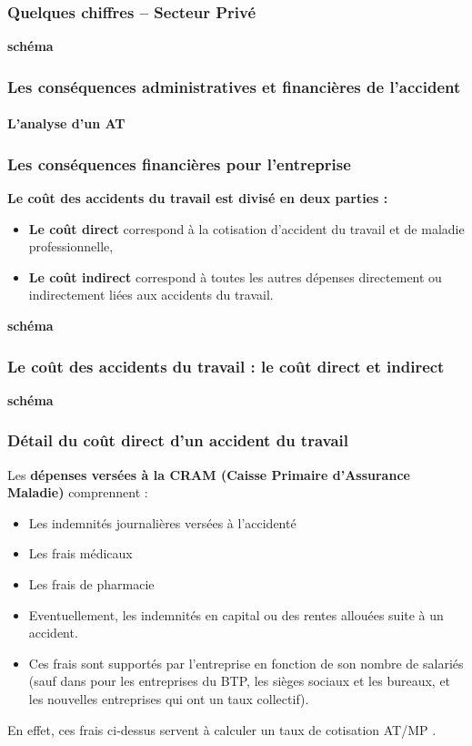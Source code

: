 \documentclass{beamer}
\begin{document}
\begin{frame}
\frametitle{Quelques chiffres – Secteur Privé}

\textbf{schéma}
\end{frame}

\begin{frame}
\frametitle{Les conséquences administratives et financières de l'accident}
\framesubtitle{L’analyse d'un AT}

\end{frame}


\begin{frame}
\frametitle{Les conséquences financières pour l’entreprise}

\textbf{Le coût des accidents du travail est divisé en deux parties : }
\begin{itemize}
\item \textbf{Le coût direct} correspond à la cotisation d’accident du travail et de maladie professionnelle,
\item \textbf{Le coût indirect} correspond à toutes les autres dépenses directement ou indirectement liées aux accidents du travail. 
\end{itemize}

\textbf{schéma}
\end{frame}

\begin{frame}
\frametitle{Le coût des accidents du travail : le coût direct et indirect}

\textbf{schéma}
\end{frame}

\begin{frame}
\frametitle{Détail du coût direct d’un accident du travail}

Les \textbf{dépenses versées à la CRAM (Caisse Primaire d’Assurance Maladie)} comprennent :
\begin{itemize}
\item Les indemnités journalières versées à l’accidenté 
\item Les frais médicaux 
\item Les frais de pharmacie
\item Eventuellement, les indemnités en capital ou des rentes allouées suite 	   à un accident.
\item Ces frais sont supportés par l’entreprise en fonction de son nombre de salariés (sauf dans pour les entreprises du BTP, les sièges sociaux et les bureaux, et les nouvelles entreprises qui ont un taux collectif).
\end{itemize}
 En effet, ces frais ci-dessus servent à calculer un taux de cotisation AT/MP . 
\end{frame}
\end{document}
